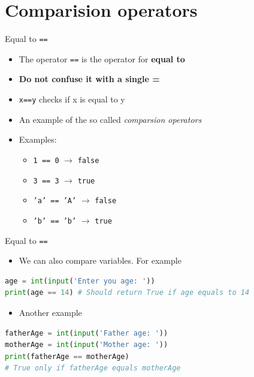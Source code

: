 \documentclass[10pt,xcolor={table,dvipsnames},t]{beamer}
\begin{document}
\section{Comparision operators}

\begin{frame}{Equal to \texttt{==}}
  \begin{itemize}
    \item The operator \texttt{==} is the operator for \textbf{equal to}
    \item \textbf{Do not confuse it with a single =}
    \item \texttt{x==y} checks if x is equal to y
    \item An example of the so called \textit{comparsion operators}
    \item Examples:
    \begin{itemize}
      \item \texttt{1 == 0} $\rightarrow$ \texttt{false}
      \item \texttt{3 == 3} $\rightarrow$ \texttt{true}
      \item \texttt{'a' == 'A'} $\rightarrow$ \texttt{false}
      \item \texttt{'b' == 'b'} $\rightarrow$ \texttt{true}
    \end{itemize}
  \end{itemize}
\end{frame}
\begin{frame}[fragile]{Equal to \texttt{==}}
  \begin{itemize}
    \item We can also compare variables. For example
  \end{itemize}
\begin{lstlisting}[language=python]
age = int(input('Enter you age: '))
print(age == 14) # Should return True if age equals to 14
\end{lstlisting}
\begin{itemize}
  \item Another example
\end{itemize}
\begin{lstlisting}[language=python]
fatherAge = int(input('Father age: '))
motherAge = int(input('Mother age: '))
print(fatherAge == motherAge) 
# True only if fatherAge equals motherAge
\end{lstlisting}
\end{frame}
\end{document}

